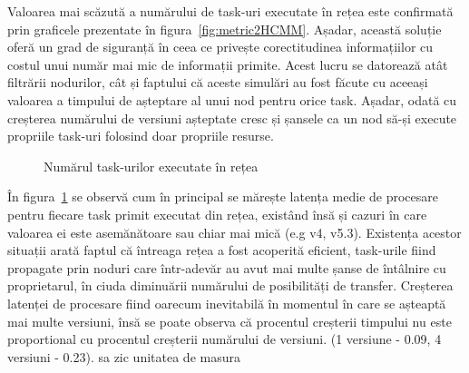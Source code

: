 \documentclass[12pt,a4paper]{report}
\begin{document}
Valoarea mai scăzută a numărului de task-uri executate în rețea este confirmată prin graficele prezentate în figura~\ref{fig:metric2HCMM}. Așadar, această soluție oferă un grad de siguranță în ceea ce privește corectitudinea informațiilor cu costul unui număr mai mic de informații primite. Acest lucru se datorează atât filtrării nodurilor, cât și faptului că aceste simulări au fost făcute cu aceeași valoarea a timpului de așteptare al unui nod pentru orice task. Așadar, odată cu creșterea numărului de versiuni așteptate cresc și șansele ca un nod să-și execute propriile task-uri folosind doar propriile resurse.

\begin{figure}%
    \centering
    \qquad
    \caption{Numărul task-urilor executate în rețea}%
    \label{fig:metric3HCMM}%
\end{figure}
 
În figura~\ref{fig:metric3HCMM} se observă cum în principal se mărește latența medie de procesare pentru fiecare task primit executat din rețea, existând însă și cazuri în care valoarea ei este asemănătoare sau chiar mai mică (e.g v4, v5.3). Existența acestor situații arată faptul că întreaga rețea a fost acoperită eficient, task-urile fiind propagate prin noduri care într-adevăr au avut mai multe șanse de întâlnire cu proprietarul, în ciuda diminuării numărului de posibilități de transfer. Creșterea latenței de procesare fiind oarecum inevitabilă în momentul în care se așteaptă mai multe versiuni, însă se poate observa că procentul creșterii timpului nu este proportional cu procentul creșterii numărului de versiuni. (1 versiune - 0.09, 4 versiuni - 0.23). sa zic unitatea de masura
\end{document}
